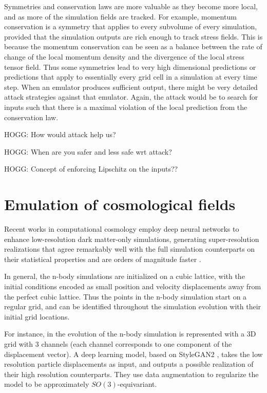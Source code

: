 \documentclass[11pt]{article}
\begin{document}
Symmetries and conservation laws are more valuable as they become more local, and as more of the simulation fields are tracked.
For example, momentum conservation is a symmetry that applies to every subvolume of every simulation, provided that the simulation outputs are rich enough to track stress fields.
This is because the momentum conservation can be seen as a balance between the rate of change of the local momentum density and the divergence of the local stress tensor field.
Thus some symmetries lead to very high dimensional predictions or predictions that apply to essentially every grid cell in a simulation at every time step.
When an emulator produces sufficient output, there might be very detailed attack strategies against that emulator.
Again, the attack would be to search for inputs such that there is a maximal violation of the local prediction from the conservation law.

HOGG: How would attack help us?

HOGG: When are you safer and less safe wrt attack?

HOGG: Concept of enforcing Lipschitz on the inputs??

\section{Emulation of cosmological fields}

Recent works in computational cosmology employ deep neural networks to enhance low-resolution dark matter-only simulations, generating super-resolution realizations that agree remarkably well with the full simulation counterparts on their statistical properties and are orders of magnitude faster \cite{li2021ai, ni2021ai}. 

In general, the n-body simulations are initialized on a cubic lattice, with the initial conditions encoded as small position and velocity displacements away from the perfect cubic lattice. Thus the points in the n-body simulation start on a regular grid, and can be identified throughout the simulation evolution with their initial grid locations.

For instance, in \cite{li2021ai} the evolution of the n-body simulation is represented with a 3D grid with 3 channels (each
channel corresponds to one component of the displacement vector). A deep learning model, based on StyleGAN2 \cite{karras2020analyzing}, takes the low resolution particle displacements as input, and outputs a possible realization of their high resolution counterparts. They use data augmentation to regularize the model to be approximately $SO(3)$-equivariant. 
\end{document}
